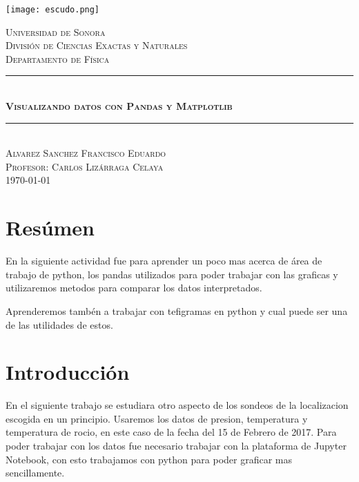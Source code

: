 \documentclass[12pt]{article}
\begin{document}

\begin{titlepage}
\newcommand{\Hrule}{\rule{\linewidth}{0.5mm}}

\begin{center}
\texttt{[image: escudo.png]}
\end{center}

\begin{center}
\textsc{\LARGE Universidad de Sonora}\\[0.5cm]
\textsc{División de Ciencias Exactas y Naturales}\\[0.1cm]
\textsc{Departamento de Física}\\[1.5cm]
\Hrule \\[0.5cm]   
   \textsc{\Large \bfseries Visualizando datos con Pandas y Matplotlib} \\[0.5cm]
\Hrule \\[1.5cm]
\textsc{\Large Alvarez Sanchez Francisco Eduardo} \\[1cm]
\textsc{\Large Profesor: Carlos Lizárraga Celaya} \\[2.5cm]
\textsc{\today}
\end{center}
\end{titlepage}
\pagebreak


\tableofcontents
\cleardoublepage
\section{Resúmen}
En la siguiente actividad fue para aprender un poco mas acerca de área de trabajo de python, los pandas utilizados para poder trabajar con las graficas y utilizaremos metodos para comparar los datos interpretados. 

Aprenderemos tambén a trabajar con tefigramas en python y cual puede ser una de las utilidades de estos.
\section{Introducción}
En el siguiente trabajo se estudiara otro aspecto de los sondeos de la localizacion escogida en un principio. Usaremos los datos de presion, temperatura y temperatura de rocio, en este caso de la fecha del 15 de Febrero de 2017. Para poder trabajar con los datos fue necesario trabajar con la plataforma de Jupyter Notebook, con esto trabajamos  con python para poder graficar mas sencillamente. 
\end{document}
